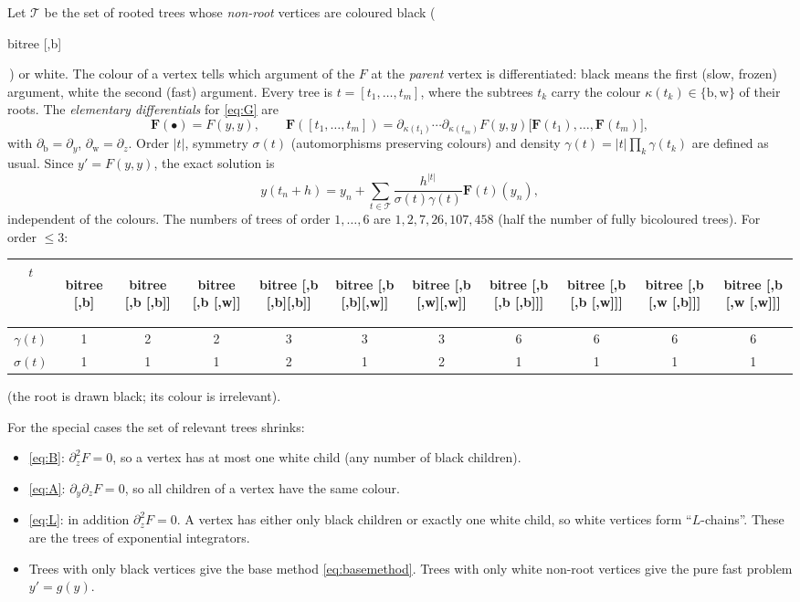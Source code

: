 \documentclass[11pt,a4paper]{article}
\theoremstyle{definition}
\theoremstyle{remark}
\newcommand{\T}{\mathcal{T}}
\newcommand{\btree}[1]{\begin{forest}bitree #1\end{forest}}
\newcommand{\Tb}{\btree{[,b]}}
\newcommand{\Tbb}{\btree{[,b [,b]]}}
\newcommand{\Tbw}{\btree{[,b [,w]]}}
\newcommand{\Tbbb}{\btree{[,b [,b][,b]]}}
\newcommand{\Tbbw}{\btree{[,b [,b][,w]]}}
\newcommand{\Tbww}{\btree{[,b [,w][,w]]}}
\newcommand{\Tbbbl}{\btree{[,b [,b [,b]]]}}
\newcommand{\Tbbwl}{\btree{[,b [,b [,w]]]}}
\newcommand{\Tbwbl}{\btree{[,b [,w [,b]]]}}
\newcommand{\Tbwwl}{\btree{[,b [,w [,w]]]}}
\begin{document}
Let $\T$ be the set of rooted trees whose \emph{non-root} vertices are
coloured black (\,\Tb\,) or white. The colour of a vertex tells which
argument of the $F$ at the \emph{parent} vertex is differentiated:
black means the first (slow, frozen) argument, white the second (fast)
argument. Every tree is $t=[t_1,\dots,t_m]$, where the subtrees $t_k$
carry the colour $\kappa(t_k)\in\{\mathrm b,\mathrm w\}$ of their roots.
The \emph{elementary differentials} for \eqref{eq:G} are
\begin{equation*}
 \mathbf F(\bullet)=F(y,y),\qquad
 \mathbf F([t_1,\dots,t_m])
 =\partial_{\kappa(t_1)}\cdots\partial_{\kappa(t_m)}F(y,y)
  \big[\mathbf F(t_1),\dots,\mathbf F(t_m)\big],
\end{equation*}
with $\partial_{\mathrm b}=\partial_y$, $\partial_{\mathrm w}=\partial_z$.
Order $|t|$, symmetry $\sigma(t)$ (automorphisms preserving colours) and
density $\gamma(t)=|t|\prod_k\gamma(t_k)$ are defined as usual. Since
$y'=F(y,y)$, the exact solution is
\begin{equation*}
 y(t_n+h)=y_n+\sum_{t\in\T}\frac{h^{|t|}}{\sigma(t)\gamma(t)}\mathbf F(t)(y_n),
\end{equation*}
independent of the colours. The numbers of trees of order $1,\dots,6$
are $1,2,7,26,107,458$ (half the number of fully bicoloured trees). For
order $\le3$:
\begin{center}
\begin{tabular}{ccccccccccc}
\toprule
$t$ & \Tb & \Tbb & \Tbw & \Tbbb & \Tbbw & \Tbww & \Tbbbl & \Tbbwl & \Tbwbl & \Tbwwl\\
\midrule
$\gamma(t)$ & 1 & 2 & 2 & 3 & 3 & 3 & 6 & 6 & 6 & 6\\
$\sigma(t)$ & 1 & 1 & 1 & 2 & 1 & 2 & 1 & 1 & 1 & 1\\
\bottomrule
\end{tabular}
\end{center}
(the root is drawn black; its colour is irrelevant).

For the special cases the set of relevant trees shrinks:
\begin{itemize}
\item \eqref{eq:B}: $\partial_z^2F=0$, so a vertex has at most one
  white child (any number of black children).
\item \eqref{eq:A}: $\partial_y\partial_zF=0$, so all children of a
  vertex have the same colour.
\item \eqref{eq:L}: in addition $\partial_z^2F=0$. A vertex has either
  only black children or exactly one white child, so white vertices form
  ``$L$-chains''. These are the trees of exponential integrators.
\item Trees with only black vertices give the base method
  \eqref{eq:basemethod}. Trees with only white non-root vertices give the
  pure fast problem $y'=g(y)$.
\end{itemize}
\end{document}
